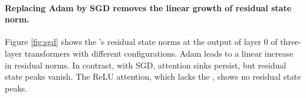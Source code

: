 
\paragraph{Replacing Adam by SGD removes the linear growth of residual state norm.} Figure \ref{fig:sgd} shows the \bos's residual state norms at the output of layer $0$ of three-layer transformers with different configurations. Adam leads to a linear increase in residual norms. In contrast, with SGD, attention sinks persist, but residual state peaks vanish. The ReLU attention, which lacks the \activedormant, shows no residual state peaks. 







